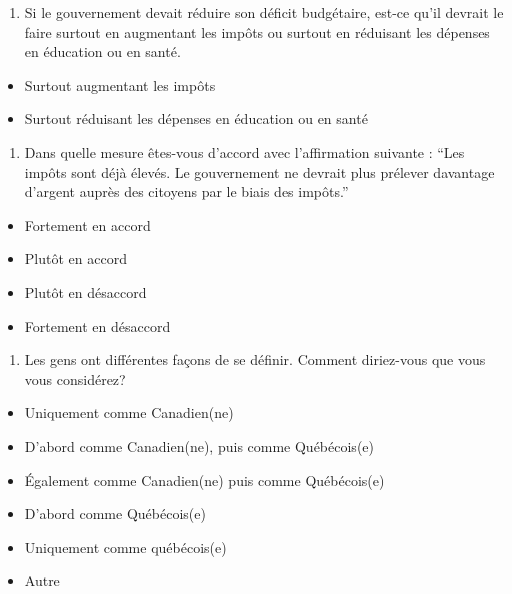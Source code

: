 \documentclass[
  letterpaper,
  DIV=11,
  numbers=noendperiod]{scrreprt}
\providecommand{\tightlist}{%
  \setlength{\itemsep}{0pt}\setlength{\parskip}{0pt}}\usepackage{longtable,booktabs,array}
\begin{document}
\begin{enumerate}
\def\labelenumi{\arabic{enumi}.}
\setcounter{enumi}{25}
\tightlist
\item
  Si le gouvernement devait réduire son déficit budgétaire, est-ce qu'il
  devrait le faire surtout en augmentant les impôts ou surtout en
  réduisant les dépenses en éducation ou en santé.
\end{enumerate}

\begin{itemize}
\tightlist
\item
  Surtout augmentant les impôts
\item
  Surtout réduisant les dépenses en éducation ou en santé
\end{itemize}

\begin{enumerate}
\def\labelenumi{\arabic{enumi}.}
\setcounter{enumi}{26}
\tightlist
\item
  Dans quelle mesure êtes-vous d'accord avec l'affirmation suivante :
  ``Les impôts sont déjà élevés. Le gouvernement ne devrait plus
  prélever davantage d'argent auprès des citoyens par le biais des
  impôts.''
\end{enumerate}

\begin{itemize}
\tightlist
\item
  Fortement en accord
\item
  Plutôt en accord
\item
  Plutôt en désaccord
\item
  Fortement en désaccord
\end{itemize}

\begin{enumerate}
\def\labelenumi{\arabic{enumi}.}
\setcounter{enumi}{27}
\tightlist
\item
  Les gens ont différentes façons de se définir. Comment diriez-vous que
  vous vous considérez?
\end{enumerate}

\begin{itemize}
\tightlist
\item
  Uniquement comme Canadien(ne)
\item
  D'abord comme Canadien(ne), puis comme Québécois(e)
\item
  Également comme Canadien(ne) puis comme Québécois(e)
\item
  D'abord comme Québécois(e)
\item
  Uniquement comme québécois(e)
\item
  Autre
\end{itemize}
\end{document}
